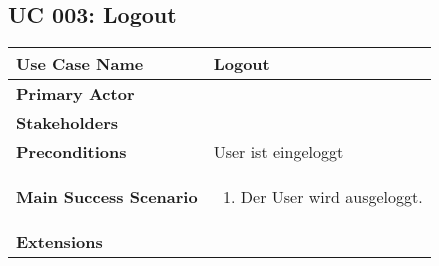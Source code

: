 \subsection{UC 003: Logout}
\label{uc:003-logout}

\begin{tabular}{|l|p{}|}
\hline
\textbf{Use Case Name} 	&	Logout	\\ \hline
\textbf{Primary Actor} 	&		\\ \hline
\textbf{Stakeholders}	&		\\ \hline
\textbf{Preconditions}	&	User ist eingeloggt	\\ \hline
\textbf{Main Success Scenario}	&
\begin{enumerate}
	\item Der User wird ausgeloggt.
\end{enumerate}
\\ \hline
\textbf{Extensions}	& 	\\ \hline
\end{tabular}